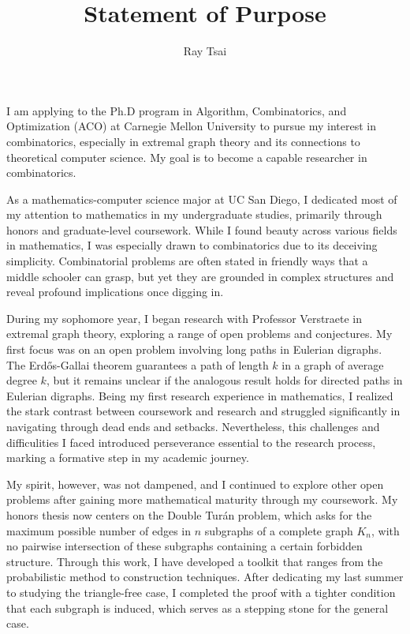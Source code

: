 \documentclass[12pt]{article}
\title{Statement of Purpose}
\author{Ray Tsai}
\date{}
\begin{document}
\maketitle

\vspace{-0.25in}

I am applying to the Ph.D program in Algorithm, Combinatorics, and Optimization (ACO) at Carnegie
Mellon University to pursue my interest in combinatorics, especially in extremal graph theory and
its connections to theoretical computer science. My goal is to become a capable researcher in
combinatorics.

As a mathematics-computer science major at UC San Diego, I dedicated most of my attention to
mathematics in my undergraduate studies, primarily through honors and graduate-level coursework.
While I found beauty across various fields in mathematics, I was especially drawn to combinatorics
due to its deceiving simplicity. Combinatorial problems are often stated in friendly ways that a
middle schooler can grasp, but yet they are grounded in complex structures and reveal profound
implications once digging in.

During my sophomore year, I began research with Professor Verstraete in extremal graph theory,
exploring a range of open problems and conjectures. My first focus was on an open problem involving
long paths in Eulerian digraphs. The Erdős-Gallai theorem guarantees a path of length $k$ in a graph
of average degree $k$, but it remains unclear if the analogous result holds for directed paths in
Eulerian digraphs. Being my first research experience in mathematics, I realized the stark contrast
between coursework and research and struggled significantly in navigating through dead ends and
setbacks. Nevertheless, this challenges and difficulities I faced introduced perseverance essential
to the research process, marking a formative step in my academic journey.

My spirit, however, was not dampened, and I continued to explore other open problems after gaining
more mathematical maturity through my coursework. My honors thesis now centers on the Double Turán
problem, which asks for the maximum possible number of edges in $n$ subgraphs of a complete graph
$K_n$, with no pairwise intersection of these subgraphs containing a certain forbidden structure.
Through this work, I have developed a toolkit that ranges from the probabilistic method to
construction techniques. After dedicating my last summer to studying the triangle-free case, I
completed the proof with a tighter condition that each subgraph is induced, which serves as a
stepping stone for the general case. 
\end{document}
